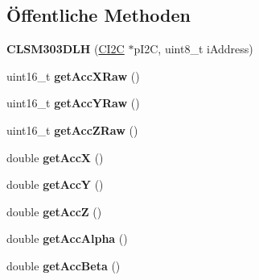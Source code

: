 \subsection*{Öffentliche \-Methoden}
\begin{DoxyCompactItemize}
\item 
\hypertarget{class_c_l_s_m303_d_l_h_a02e1a3a5e5fe5d9c6656007c79bc94d0}{{\bfseries \-C\-L\-S\-M303\-D\-L\-H} (\hyperlink{class_c_i2_c}{\-C\-I2\-C} $\ast$p\-I2\-C, uint8\-\_\-t i\-Address)}\label{class_c_l_s_m303_d_l_h_a02e1a3a5e5fe5d9c6656007c79bc94d0}

\item 
\hypertarget{class_c_l_s_m303_d_l_h_a90eec511291bf7019dc48df6bca7aec8}{uint16\-\_\-t {\bfseries get\-Acc\-X\-Raw} ()}\label{class_c_l_s_m303_d_l_h_a90eec511291bf7019dc48df6bca7aec8}

\item 
\hypertarget{class_c_l_s_m303_d_l_h_ad4a82f3b958a42732a2acefc03728e67}{uint16\-\_\-t {\bfseries get\-Acc\-Y\-Raw} ()}\label{class_c_l_s_m303_d_l_h_ad4a82f3b958a42732a2acefc03728e67}

\item 
\hypertarget{class_c_l_s_m303_d_l_h_a776fae504ef79ba93b8c415b5ecde5ad}{uint16\-\_\-t {\bfseries get\-Acc\-Z\-Raw} ()}\label{class_c_l_s_m303_d_l_h_a776fae504ef79ba93b8c415b5ecde5ad}

\item 
\hypertarget{class_c_l_s_m303_d_l_h_a148c18e8e9f19107c0283d957b1091fb}{double {\bfseries get\-Acc\-X} ()}\label{class_c_l_s_m303_d_l_h_a148c18e8e9f19107c0283d957b1091fb}

\item 
\hypertarget{class_c_l_s_m303_d_l_h_ad8787615d5c0edb904155403e941c0c4}{double {\bfseries get\-Acc\-Y} ()}\label{class_c_l_s_m303_d_l_h_ad8787615d5c0edb904155403e941c0c4}

\item 
\hypertarget{class_c_l_s_m303_d_l_h_abf9d66bc467e3940a757f6ab300161b2}{double {\bfseries get\-Acc\-Z} ()}\label{class_c_l_s_m303_d_l_h_abf9d66bc467e3940a757f6ab300161b2}

\item 
\hypertarget{class_c_l_s_m303_d_l_h_a3848205668254941907cf808afac8c1e}{double {\bfseries get\-Acc\-Alpha} ()}\label{class_c_l_s_m303_d_l_h_a3848205668254941907cf808afac8c1e}

\item 
\hypertarget{class_c_l_s_m303_d_l_h_a9838438bcc4cc08c6543efac04b7f872}{double {\bfseries get\-Acc\-Beta} ()}\label{class_c_l_s_m303_d_l_h_a9838438bcc4cc08c6543efac04b7f872}


\end{DoxyCompactItemize}
